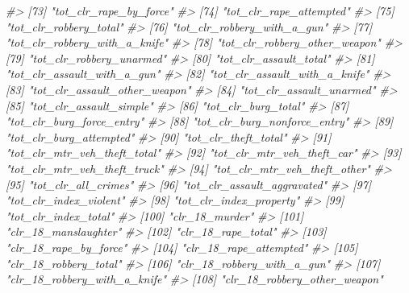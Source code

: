 \documentclass[
]{krantz}
\makeatletter
\newenvironment{Shaded}{\begin{snugshade}}{\end{snugshade}}
\newcommand{\CommentTok}[1]{\textcolor[rgb]{0.37,0.37,0.37}{\textit{#1}}}
\newenvironment{kframe}{%
\medskip{}
\setlength{\fboxsep}{.8em}
 \def\at@end@of@kframe{}%
 \ifinner\ifhmode%
  \def\at@end@of@kframe{\end{minipage}}%
  \begin{minipage}{\columnwidth}%
 \fi\fi%
 \def\FrameCommand##1{\hskip\@totalleftmargin \hskip-\fboxsep
 \colorbox{shadecolor}{##1}\hskip-\fboxsep
     \hskip-\linewidth \hskip-\@totalleftmargin \hskip\columnwidth}%
 \MakeFramed {\advance\hsize-\width
   \@totalleftmargin\z@ \linewidth\hsize
   \@setminipage}}%
 {\par\unskip\endMakeFramed%
 \at@end@of@kframe}
\renewenvironment{Shaded}{\begin{kframe}}{\end{kframe}}
\makeatother
\begin{document}
\begin{Shaded}
\begin{Highlighting}[]
\CommentTok{\#\textgreater{}  [73] "tot\_clr\_rape\_by\_force"         }
\CommentTok{\#\textgreater{}  [74] "tot\_clr\_rape\_attempted"        }
\CommentTok{\#\textgreater{}  [75] "tot\_clr\_robbery\_total"         }
\CommentTok{\#\textgreater{}  [76] "tot\_clr\_robbery\_with\_a\_gun"    }
\CommentTok{\#\textgreater{}  [77] "tot\_clr\_robbery\_with\_a\_knife"  }
\CommentTok{\#\textgreater{}  [78] "tot\_clr\_robbery\_other\_weapon"  }
\CommentTok{\#\textgreater{}  [79] "tot\_clr\_robbery\_unarmed"       }
\CommentTok{\#\textgreater{}  [80] "tot\_clr\_assault\_total"         }
\CommentTok{\#\textgreater{}  [81] "tot\_clr\_assault\_with\_a\_gun"    }
\CommentTok{\#\textgreater{}  [82] "tot\_clr\_assault\_with\_a\_knife"  }
\CommentTok{\#\textgreater{}  [83] "tot\_clr\_assault\_other\_weapon"  }
\CommentTok{\#\textgreater{}  [84] "tot\_clr\_assault\_unarmed"       }
\CommentTok{\#\textgreater{}  [85] "tot\_clr\_assault\_simple"        }
\CommentTok{\#\textgreater{}  [86] "tot\_clr\_burg\_total"            }
\CommentTok{\#\textgreater{}  [87] "tot\_clr\_burg\_force\_entry"      }
\CommentTok{\#\textgreater{}  [88] "tot\_clr\_burg\_nonforce\_entry"   }
\CommentTok{\#\textgreater{}  [89] "tot\_clr\_burg\_attempted"        }
\CommentTok{\#\textgreater{}  [90] "tot\_clr\_theft\_total"           }
\CommentTok{\#\textgreater{}  [91] "tot\_clr\_mtr\_veh\_theft\_total"   }
\CommentTok{\#\textgreater{}  [92] "tot\_clr\_mtr\_veh\_theft\_car"     }
\CommentTok{\#\textgreater{}  [93] "tot\_clr\_mtr\_veh\_theft\_truck"   }
\CommentTok{\#\textgreater{}  [94] "tot\_clr\_mtr\_veh\_theft\_other"   }
\CommentTok{\#\textgreater{}  [95] "tot\_clr\_all\_crimes"            }
\CommentTok{\#\textgreater{}  [96] "tot\_clr\_assault\_aggravated"    }
\CommentTok{\#\textgreater{}  [97] "tot\_clr\_index\_violent"         }
\CommentTok{\#\textgreater{}  [98] "tot\_clr\_index\_property"        }
\CommentTok{\#\textgreater{}  [99] "tot\_clr\_index\_total"           }
\CommentTok{\#\textgreater{} [100] "clr\_18\_murder"                 }
\CommentTok{\#\textgreater{} [101] "clr\_18\_manslaughter"           }
\CommentTok{\#\textgreater{} [102] "clr\_18\_rape\_total"             }
\CommentTok{\#\textgreater{} [103] "clr\_18\_rape\_by\_force"          }
\CommentTok{\#\textgreater{} [104] "clr\_18\_rape\_attempted"         }
\CommentTok{\#\textgreater{} [105] "clr\_18\_robbery\_total"          }
\CommentTok{\#\textgreater{} [106] "clr\_18\_robbery\_with\_a\_gun"     }
\CommentTok{\#\textgreater{} [107] "clr\_18\_robbery\_with\_a\_knife"   }
\CommentTok{\#\textgreater{} [108] "clr\_18\_robbery\_other\_weapon"   }

\end{Highlighting}
\end{Shaded}
\end{document}
